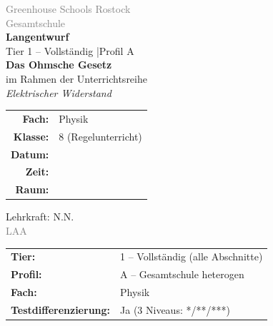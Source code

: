 \documentclass[11pt,a4paper]{article}
\newcommand{\plantier}{1}
\newcommand{\lerngruppenprofil}{A}
\newcommand{\fach}{Physik}
\newcommand{\jahrgangsstufe}{8}
\newcommand{\schulart}{Gesamtschule}
\newcommand{\kursart}{Regelunterricht}
\newcommand{\stundenthema}{Das Ohmsche Gesetz}
\newcommand{\reihenthema}{Elektrischer Widerstand}
\newcommand{\lehrkraft}{N.N.}
\newcommand{\ausbildungsstand}{LAA}
\begin{document}
\begin{titlepage}
    \centering
    \vspace*{2cm}

    {\Large\textcolor{gray}{Greenhouse Schools Rostock}}\\[0.5cm]
    {\large\textcolor{gray}{\schulart}}\\[2cm]

    {\Huge\textcolor{fach}{\textbf{Langentwurf}}}\\[0.5cm]
    {\large Tier \plantier{} -- Vollständig \quad|\quad Profil \lerngruppenprofil}\\[2cm]

    {\LARGE\textbf{\stundenthema}}\\[0.5cm]
    {\large im Rahmen der Unterrichtsreihe}\\[0.3cm]
    {\Large\textit{\reihenthema}}\\[2cm]

    \begin{tabular}{rl}
        \textbf{Fach:} & \fach \\[0.3cm]
        \textbf{Klasse:} & \jahrgangsstufe{} (\kursart) \\[0.3cm]
        \textbf{Datum:} & \underline{\hspace{3cm}} \\[0.3cm]
        \textbf{Zeit:} & \underline{\hspace{3cm}} \\[0.3cm]
        \textbf{Raum:} & \underline{\hspace{3cm}} \\[0.3cm]
    \end{tabular}

    \vfill

    {\large Lehrkraft: \lehrkraft}\\[0.3cm]
    {\normalsize\textcolor{gray}{\ausbildungsstand}}\\[1cm]

\end{titlepage}

\tableofcontents
\newpage

\begin{infobox}
\begin{tabular}{ll}
    \textbf{Tier:} & 1 -- Vollständig (alle Abschnitte) \\[0.3em]
    \textbf{Profil:} & A -- Gesamtschule heterogen \\[0.3em]
    \textbf{Fach:} & Physik \\[0.3em]
    \textbf{Testdifferenzierung:} & Ja (3 Niveaus: */**/***)
\end{tabular}
\end{infobox}
\end{document}
